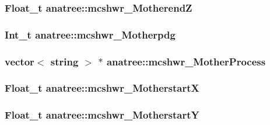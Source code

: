 \hypertarget{classanatree_a384403fb919a693d2e02963b8eb8d326}{
\subsubsection[{mcshwr\-\_\-\-Motherend\-Z}]{\setlength{\rightskip}{0pt plus 5cm}Float\-\_\-t anatree\-::mcshwr\-\_\-\-Motherend\-Z}}\label{classanatree_a384403fb919a693d2e02963b8eb8d326}
\hypertarget{classanatree_ae3d5dea22be9d6c134892c5740d6e69a}{
\subsubsection[{mcshwr\-\_\-\-Motherpdg}]{\setlength{\rightskip}{0pt plus 5cm}Int\-\_\-t anatree\-::mcshwr\-\_\-\-Motherpdg}}\label{classanatree_ae3d5dea22be9d6c134892c5740d6e69a}
\hypertarget{classanatree_a8eca5519b33722cef863970e40a1826a}{
\subsubsection[{mcshwr\-\_\-\-Mother\-Process}]{\setlength{\rightskip}{0pt plus 5cm}vector$<$ string $>$ $\ast$ anatree\-::mcshwr\-\_\-\-Mother\-Process}}\label{classanatree_a8eca5519b33722cef863970e40a1826a}
\hypertarget{classanatree_aee48afcf4efb09f982471bc1a7c63680}{
\subsubsection[{mcshwr\-\_\-\-Motherstart\-X}]{\setlength{\rightskip}{0pt plus 5cm}Float\-\_\-t anatree\-::mcshwr\-\_\-\-Motherstart\-X}}\label{classanatree_aee48afcf4efb09f982471bc1a7c63680}
\hypertarget{classanatree_a225c96218a29f49753c83810dcc7bf55}{
\subsubsection[{mcshwr\-\_\-\-Motherstart\-Y}]{\setlength{\rightskip}{0pt plus 5cm}Float\-\_\-t anatree\-::mcshwr\-\_\-\-Motherstart\-Y}}\label{classanatree_a225c96218a29f49753c83810dcc7bf55}
